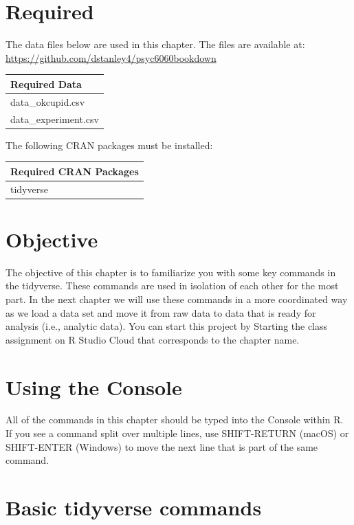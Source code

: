 \documentclass[
]{krantz}
\begin{document}
\hypertarget{required}{%
\section{Required}\label{required}}

The data files below are used in this chapter. The files are available at: \url{https://github.com/dstanley4/psyc6060bookdown}

\begin{longtable}[]{@{}l@{}}
\toprule
Required Data\tabularnewline
\midrule
\endhead
data\_okcupid.csv\tabularnewline
data\_experiment.csv\tabularnewline
\bottomrule
\end{longtable}

The following CRAN packages must be installed:

\begin{longtable}[]{@{}l@{}}
\toprule
Required CRAN Packages\tabularnewline
\midrule
\endhead
tidyverse\tabularnewline
\bottomrule
\end{longtable}

\hypertarget{objective}{%
\section{Objective}\label{objective}}

The objective of this chapter is to familiarize you with some key commands in the tidyverse. These commands are used in isolation of each other for the most part. In the next chapter we will use these commands in a more coordinated way as we load a data set and move it from raw data to data that is ready for analysis (i.e., analytic data). You can start this project by Starting the class assignment on R Studio Cloud that corresponds to the chapter name.

\hypertarget{using-the-console}{%
\section{Using the Console}\label{using-the-console}}

All of the commands in this chapter should be typed into the Console within R. If you see a command split over multiple lines, use SHIFT-RETURN (macOS) or SHIFT-ENTER (Windows) to move the next line that is part of the same command.

\hypertarget{basic-tidyverse-commands}{%
\section{Basic tidyverse commands}\label{basic-tidyverse-commands}}
\end{document}

